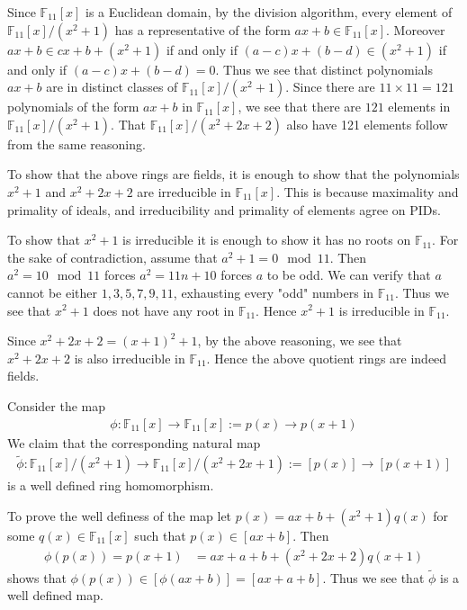 \documentclass[12pt]{exam}
\theoremstyle{plain} %
\theoremstyle{definition} %
\theoremstyle{remark} %
\begin{document}
\begin{questions}
  \question
  \begin{solution}
    Since $\mathbb{F}_{11}[x]$ is a Euclidean domain, by the division
    \label{10}
    algorithm, every element of $\mathbb{F}_{11}[x]/(x^2 + 1)$ has a
    representative of the form $ax +b \in \mathbb{F}_{11}[x]$.
    Moreover $ax + b \in cx + b + (x^2 + 1)$ if and only if $(a-c)x +
    (b - d) \in (x^2 + 1)$ if and only if $(a-c) x + (b-d) = 0$. Thus
    we see that distinct polynomials $ax + b$ are in distinct classes
    of $\mathbb{F}_{11}[x]/(x^2  + 1)$. Since there are $11 \times 11
    = 121$ polynomials of the form $ax + b$ in $\mathbb{F}_{11}[x]$,
    we see that there are $121$ elements in
    $\mathbb{F}_{11}[x]/(x^2+1)$. That $\mathbb{F}_{11}[x]/(x^2+ 2x + 2)$
    also have 121 elements follow from the same reasoning.

    To show that the above rings are fields, it is enough to show
    that the polynomials $x^2 +1$ and $x^2 + 2x + 2$ are irreducible
    in $\mathbb{F}_{11}[x]$. This is because maximality and primality
    of ideals,  and irreducibility and primality of elements agree on PIDs.

    To show that $x^2 + 1$ is irreducible it is enough to show it has
    no roots on $\mathbb{F}_11$. For the sake of contradiction,
    assume that $a^2 + 1 = 0 \mod 11$. Then $a^2 = 10 \mod 11$ forces
    $a^2 = 11n + 10$ forces $a$ to be odd. We can verify that $a$
    cannot be either $1, 3, 5, 7, 9, 11$, exhausting every "odd"
    numbers in $\mathbb{F}_{11}$. Thus we see that $x^2 + 1$ does not
    have any root in $\mathbb{F}_{11}$. Hence $x^2 + 1$ is
    irreducible in $\mathbb{F}_{11}$.

    Since $x^2 + 2x +2 = (x+1)^2 +1$, by the above reasoning, we see
    that $x^2 + 2x + 2$ is also irreducible in $\mathbb{F}_{11}$.
    Hence the above quotient rings are indeed fields.

    Consider the map
    \begin{align*}
      \phi : \mathbb{F}_{11}[x] \to \mathbb{F}_{11}[x]:= p(x) \to p(x+1)
    \end{align*}
    We claim that the corresponding natural map
    \begin{align*}
      \tilde{\phi}: \mathbb{F}_{11}[x]/(x^2 + 1) \to
      \mathbb{F}_{11}[x]/(x^2 + 2x + 1):= [p(x)] \to [p(x+1)]
    \end{align*}
    is a well defined ring homomorphism.

    To prove the well definess of the map let $p(x) = ax + b + (x^2 +
    1)q(x)$ for some $q(x) \in
    \mathbb{F}_{11}[x]$ such that $p(x) \in [ax +b]$. Then
    \begin{align*}
      \phi(p(x)) = p(x+1) &= ax + a + b + (x^2 + 2x + 2)q(x + 1)
    \end{align*}
    shows that $\phi(p(x)) \in [\phi(ax + b)] = [ax + a + b]$. Thus
    we see that $\tilde{\phi}$ is a well defined map.


\end{solution}
\end{questions}
\end{document}
